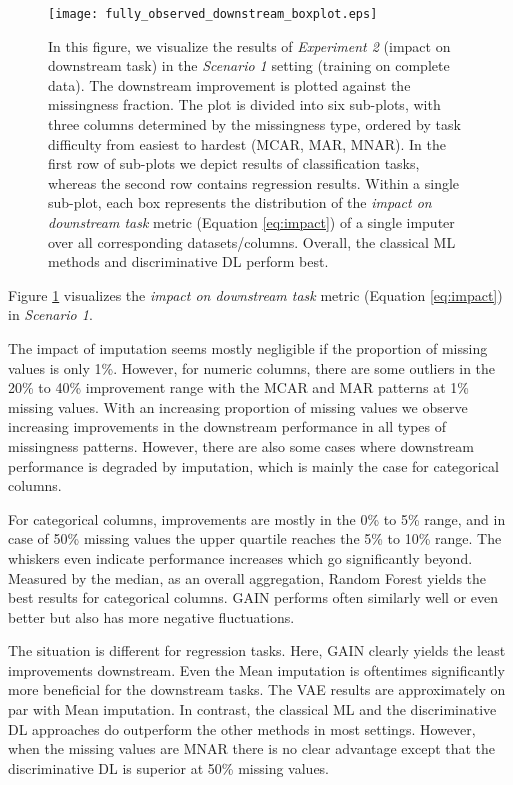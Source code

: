 \begin{figure}\centering
	\texttt{[image: fully\_observed\_downstream\_boxplot.eps]}

	\caption[Downstream Ranks - Fully Observed]{In this figure, we visualize the results of \textit{Experiment 2} (impact on downstream task) in the \textit{Scenario 1} setting (training on complete data). The downstream improvement is plotted against the missingness fraction. The plot is divided into six sub-plots, with three columns determined by the missingness type, ordered by task difficulty from easiest to hardest (MCAR, MAR, MNAR). In the first row of sub-plots we depict results of classification tasks, whereas the second row contains regression results. Within a single sub-plot, each box represents the distribution of the \textit{impact on downstream task} metric (Equation \ref{eq:impact}) of a single imputer over all corresponding datasets/columns. Overall, the classical ML methods and discriminative DL perform best.
    }
	\label{fig:fully_observed_downstream_boxplot}
\end{figure}

Figure \ref{fig:fully_observed_downstream_boxplot} visualizes the \textit{impact on downstream task} metric (Equation \ref{eq:impact}) in \textit{Scenario 1}. 

The impact of imputation seems mostly negligible if the proportion of missing values is only 1\%. However, for numeric columns, there are some outliers in the 20\% to 40\% improvement range with the MCAR and MAR patterns at 1\% missing values. With an increasing proportion of missing values we observe increasing improvements in the downstream performance in all types of missingness patterns. However, there are also some cases where downstream performance is degraded by imputation, which is mainly the case for categorical columns.

For categorical columns, improvements are mostly in the 0\% to 5\% range, and in case of 50\% missing values the upper quartile reaches the 5\% to 10\% range. The whiskers even indicate performance increases which go significantly beyond. Measured by the median, as an overall aggregation, Random Forest yields the best results for categorical columns. GAIN performs often similarly well or even better but also has more negative fluctuations.

The situation is different for regression tasks. Here, GAIN clearly yields the least improvements downstream. Even the Mean imputation is oftentimes significantly more beneficial for the downstream tasks. The VAE results are approximately on par with Mean imputation. In contrast, the classical ML and the discriminative DL approaches do outperform the other methods in most settings. However, when the missing values are MNAR there is no clear advantage except that the discriminative DL is superior at 50\% missing values.

